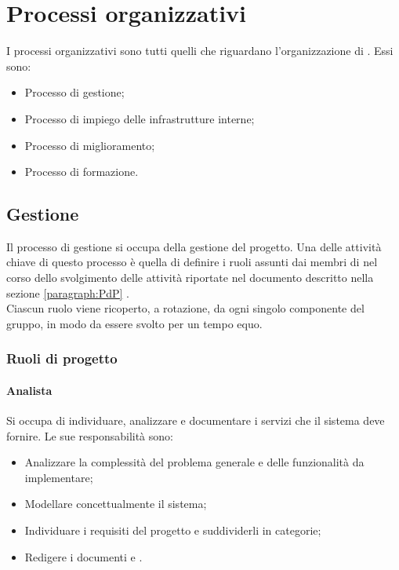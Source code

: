 \section{Processi organizzativi}\label{section:Processi organizzativi}
I processi organizzativi sono tutti quelli che riguardano l'organizzazione di \groupName. Essi sono:
\begin{itemize}
\item Processo di gestione;
\item Processo di impiego delle infrastrutture interne;
\item Processo di miglioramento;
\item Processo di formazione.
\end{itemize}

\subsection{Gestione}
Il processo di gestione si occupa della gestione del progetto. Una delle attività chiave di questo processo è quella di definire i ruoli assunti dai membri di \groupName{} nel corso dello svolgimento delle attività riportate nel documento \docNameVersionPdP{} descritto nella sezione \ref{paragraph:PdP} .\\
Ciascun ruolo viene ricoperto, a rotazione, da ogni singolo componente del gruppo, in modo da essere svolto per un tempo equo.

\subsubsection{Ruoli di progetto}
\paragraph{Analista}
Si occupa di individuare, analizzare e documentare i servizi che il sistema deve fornire. 
Le sue responsabilità sono:
\begin{itemize}
	\item Analizzare la complessità del problema generale e delle funzionalità da implementare;
	\item Modellare concettualmente il sistema;
	\item Individuare i requisiti del progetto e suddividerli in categorie;
	\item Redigere i documenti \docNameVersionAdR{} e \docNameVersionSdF.
\end{itemize}

